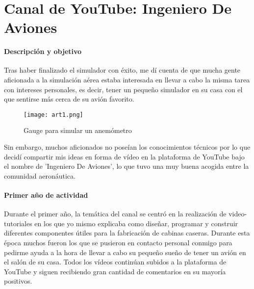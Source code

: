 \section[Canal Youtube]{Canal de YouTube: Ingeniero De Aviones}

\paragraph{Descripción y objetivo}

Tras haber finalizado el simulador con éxito, me dí cuenta de que mucha gente aficionada a la simulación aérea estaba interesada en llevar a cabo la misma tarea con intereses personales, es decir, tener un pequeño simulador en su casa con el que sentirse más cerca de su avión favorito.\\

\begin{wrapfigure}{r}{0.5\linewidth}
	\centering
	\texttt{[image: art1.png]}
	\caption*{Gauge para simular un anemómetro}
	\label{labelformat=empty}
\end{wrapfigure}

Sin embargo, muchos aficionados no poseían los conocimientos técnicos por lo que decidí compartir mis ideas en forma de vídeo en la plataforma de YouTube bajo el nombre de 'Ingeniero De Aviones', lo que tuvo una muy buena acogida entre la comunidad aeronáutica.


\paragraph{Primer año de actividad}

Durante el primer año, la temática del canal se centró en la realización de video-tutoriales en los que yo mismo explicaba como diseñar, programar y construir diferentes componentes útiles para la fabricación de cabinas caseras. Durante esta época muchos fueron los que se pusieron en contacto personal conmigo para pedirme ayuda a la hora de llevar a cabo su pequeño sueño de tener un avión en el salón de su casa. Todos los vídeos continúan subidos a la plataforma de YouTube y siguen recibiendo gran cantidad de comentarios en su mayoría positivos.

